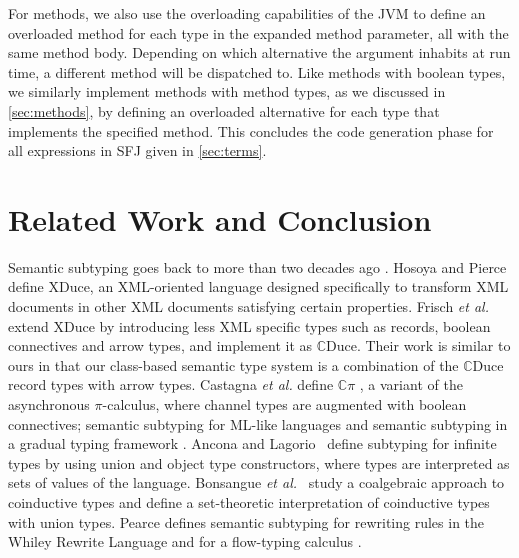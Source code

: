 \documentclass[runningheads]{llncs}
\begin{document}
For methods, we also use the overloading capabilities of the JVM to define an  overloaded method for each type in the expanded method parameter, all with the same method body.
Depending on which alternative the argument inhabits at run time, a different method will be dispatched to.
%
Like methods with boolean types, we similarly implement methods with method types, as we discussed in \autoref{sec:methods}, by defining an overloaded alternative for each type that implements the specified method.
%
This concludes the code generation phase for all expressions in SFJ given in \autoref{sec:terms}.

\section{Related Work and Conclusion}
\label{sec:conclusion}

Semantic subtyping goes back to more than two decades ago \cite{Aiken,Damm}.
%
Hosoya and Pierce \cite{XML1,XML2,XML3} define XDuce, an XML-oriented language designed specifically to transform XML documents in other XML documents satisfying certain properties.
%
Frisch \emph{et al.} \cite{FCB08} extend XDuce by introducing less XML specific types such as records, boolean connectives and arrow types, and implement it as $\mathbb{C}$Duce. Their work is similar to ours in that our class-based semantic type system is a combination of the $\mathbb{C}$Duce record types with arrow types.
%
Castagna \emph{et al.} define $\mathbb{C}\pi$ \cite{Cpi}, a variant of the asynchronous $\pi$-calculus, where channel types are augmented with boolean connectives;
semantic subtyping for ML-like languages \cite{CastagnaP016} and semantic subtyping in a gradual typing framework \cite{CastagnaL17}.
%
Ancona and Lagorio~\cite{AL10} define subtyping for infinite types by using union and object type constructors, where types are interpreted as sets of values of the language.
%
Bonsangue \emph{et al.}~\cite{BRABR14} study a coalgebraic approach to coinductive types and define a set-theoretic interpretation of coinductive types with union types.
%
Pearce \cite{Pearce19} defines semantic subtyping for rewriting rules in the Whiley Rewrite Language and for a flow-typing calculus  \cite{Pearce13}.
\end{document}
